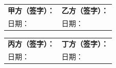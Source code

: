 \documentclass[zihao=-4,a4paper,fontset=none]{ctexart}
\begin{document}
\vspace{2cm}
\noindent
\begin{tabular}{p{5.5cm}p{2cm}p{5.5cm}p{2cm}}
  \multicolumn{2}{l}{\textbf{甲方（签字）：}\underline{\hspace{3.5em}}} & \multicolumn{2}{l}{\textbf{乙方（签字）：}\underline{\hspace{3.5em}}} \\
  \multicolumn{2}{l}{日期：\underline{\hspace{5em}}} & \multicolumn{2}{l}{日期：\underline{\hspace{5em}}} \\
\end{tabular}

\vspace{1.2cm}
\noindent
\begin{tabular}{p{5.5cm}p{2cm}p{5.5cm}p{2cm}}
  \multicolumn{2}{l}{\textbf{丙方（签字）：}\underline{\hspace{3.5em}}} & \multicolumn{2}{l}{\textbf{丁方（签字）：}\underline{\hspace{3.5em}}} \\
  \multicolumn{2}{l}{日期：\underline{\hspace{5em}}} & \multicolumn{2}{l}{日期：\underline{\hspace{5em}}} \\
\end{tabular}
\end{document}
